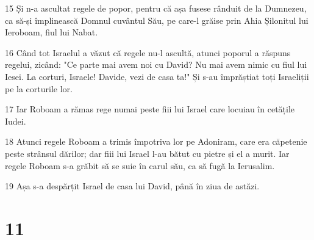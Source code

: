 \par 15 Și n-a ascultat regele de popor, pentru că așa fusese rânduit de la Dumnezeu, ca să-și împlinească Domnul cuvântul Său, pe care-l grăise prin Ahia Șilonitul lui Ieroboam, fiul lui Nabat.
\par 16 Când tot Israelul a văzut că regele nu-l ascultă, atunci poporul a răspuns regelui, zicând: "Ce parte mai avem noi cu David? Nu mai avem nimic cu fiul lui Iesei. La corturi, Israele! Davide, vezi de casa ta!" Și s-au împrăștiat toți Israeliții pe la corturile lor.
\par 17 Iar Roboam a rămas rege numai peste fiii lui Israel care locuiau în cetățile Iudei.
\par 18 Atunci regele Roboam a trimis împotriva lor pe Adoniram, care era căpetenie peste strânsul dărilor; dar fiii lui Israel l-au bătut cu pietre și el a murit. Iar regele Roboam s-a grăbit să se suie în carul său, ca să fugă la Ierusalim.
\par 19 Așa s-a despărțit Israel de casa lui David, până în ziua de astăzi.

\chapter{11}

